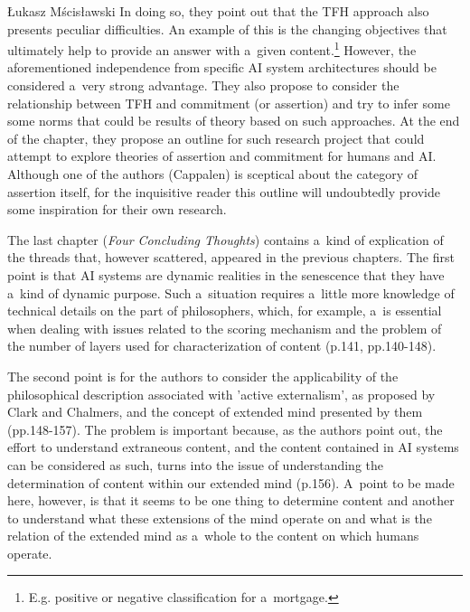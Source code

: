\begin{newrevengenv}{Łukasz Mścisławski}
In doing so, they point out that the TFH approach also presents peculiar difficulties. An example of this is the changing objectives that ultimately help to provide an answer with a~given content.\footnote{E.g. positive or negative classification for a~mortgage.} However, the aforementioned independence from specific AI system architectures should be considered a~very strong advantage. They also propose to consider the relationship between TFH and commitment (or assertion) and try to infer some some norms that could be results of theory based on such approaches. At the end of the chapter, they propose an outline for such research project that could attempt to explore theories of assertion and commitment for humans and AI. Although one of the authors (Cappalen) is sceptical about the category of assertion itself, for the inquisitive reader this outline will undoubtedly provide some inspiration for their own research.

The last chapter (\textit{Four Concluding Thoughts}) contains a~kind of explication of the threads that, however scattered, appeared in the previous chapters. The first point is that AI systems are dynamic realities in the senescence that they have a~kind of dynamic purpose. Such a~situation requires a~little more knowledge of technical details on the part of philosophers, which, for example, a~is essential when dealing with issues related to the scoring mechanism and the problem of the number of layers used for characterization of content (p.141, pp.140-148).

The second point is for the authors to consider the applicability of the philosophical description associated with 'active externalism', as proposed by Clark and Chalmers, and the concept of extended mind presented by them (pp.148-157). The problem is important because, as the authors point out, the effort to understand extraneous content, and the content contained in AI systems can be considered as such, turns into the issue of understanding the determination of content within our extended mind (p.156). A~point to be made here, however, is that it seems to be one thing to determine content and another to understand what these extensions of the mind operate on and what is the relation of the extended mind as a~whole to the content on which humans operate.


\end{newrevengenv}
